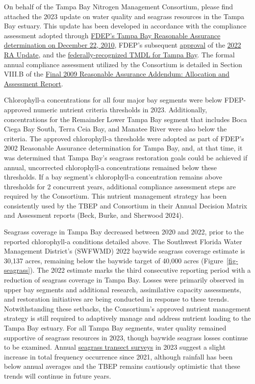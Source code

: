 \documentclass[
  letterpaper,
  DIV=11,
  numbers=noendperiod]{scrreport}
\begin{document}
On behalf of the Tampa Bay Nitrogen Management Consortium, please find
attached the 2023 update on water quality and seagrass resources in the
Tampa Bay estuary. This update has been developed in accordance with the
compliance assessment adopted through
\href{https://drive.google.com/file/d/1wV3w8ack_fLNK3yS-xTR7LTmziNtZ8CN/view?usp=share_link}{FDEP's
Tampa Bay Reasonable Assurance determination on December 22, 2010},
FDEP's subsequent
\href{https://drive.google.com/file/d/1IIloBN5RoZPB6vgWzEjmMQyFjFL3fq0Y/view?usp=share_link}{approval}
of the
\href{https://drive.google.com/file/d/18HHMx4U6vHNrFyepEFuoTJ_sEKyTA_gu/view}{2022
RA Update}, and the
\href{https://drive.google.com/file/d/18_W1qKT2I0j9m0mLC7wWjndSNR-0iWEF/view?usp=share_link}{federally-recognized
TMDL for Tampa Bay}. The formal annual compliance assessment utilized by
the Consortium is detailed in Section VIII.B of the
\href{https://drive.google.com/file/d/10IjJAfcGFf007a5VdPXAUtUi4dx-cmsA/view}{Final
2009 Reasonable Assurance Addendum: Allocation and Assessment Report}.

Chlorophyll-a concentrations for all four major bay segments were below
FDEP-approved numeric nutrient criteria thresholds in 2023.
Additionally, concentrations for the Remainder Lower Tampa Bay segment
that includes Boca Ciega Bay South, Terra Ceia Bay, and Manatee River
were also below the criteria. The approved chlorophyll-a thresholds were
adopted as part of FDEP's 2002 Reasonable Assurance determination for
Tampa Bay, and, at that time, it was determined that Tampa Bay's
seagrass restoration goals could be achieved if annual, uncorrected
chlorophyll-a concentrations remained below these thresholds. If a bay
segment's chlorophyll-a concentration remains above thresholds for 2
concurrent years, additional compliance assessment steps are required by
the Consortium. This nutrient management strategy has been consistently
used by the TBEP and Consortium in their Annual Decision Matrix and
Assessment reports (Beck, Burke, and Sherwood 2024).

Seagrass coverage in Tampa Bay decreased between 2020 and 2022, prior to
the reported chlorophyll-a conditions detailed above. The Southwest
Florida Water Management District's (SWFWMD) 2022 baywide seagrass
coverage estimate is 30,137 acres, remaining below the baywide target of
40,000 acres (Figure~\ref{fig-seagrass}). The 2022 estimate marks the
third consecutive reporting period with a reduction of seagrass coverage
in Tampa Bay. Losses were primarily observed in upper bay segments and
additional research, assimilative capacity assessments, and restoration
initiatives are being conducted in response to these trends.
Notwithstanding these setbacks, the Consortium's approved nutrient
management strategy is still required to adaptively manage and address
nutrient loading to the Tampa Bay estuary. For all Tampa Bay segments,
water quality remained supportive of seagrass resources in 2023, though
baywide seagrass losses continue to be examined. Annual
\href{https://shiny.tbep.org/seagrasstransect-dash}{seagrass transect
surveys} in 2023 suggest a slight increase in total frequency occurrence
since 2021, although rainfall has been below annual averages and the
TBEP remains cautiously optimistic that these trends will continue in
future years.
\end{document}
